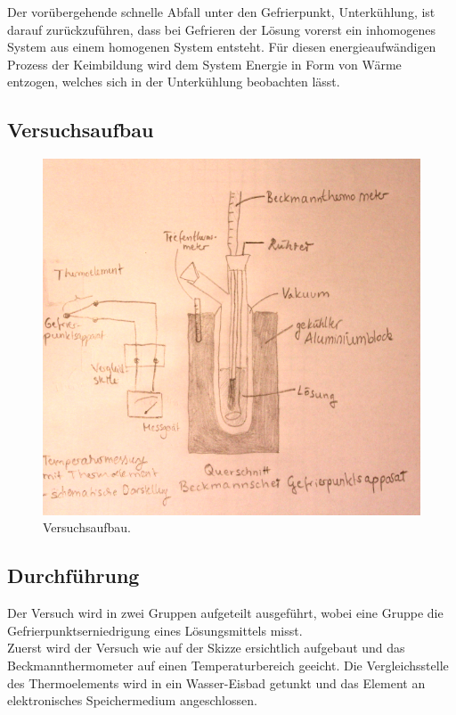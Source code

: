 \documentclass[12pt,a4paper,titlepage,headinclude,bibtotoc]{scrartcl}
\begin{document}
Der vorübergehende schnelle Abfall unter den Gefrierpunkt, Unterkühlung, ist darauf zurückzuführen, dass bei Gefrieren der Lösung vorerst ein inhomogenes System aus einem homogenen System entsteht. Für diesen energieaufwändigen Prozess der Keimbildung wird dem System Energie in Form von Wärme entzogen, welches sich in der Unterkühlung beobachten lässt.


\subsection{Versuchsaufbau}



\begin{figure} [h!]
\begin{center}
\includegraphics[scale=0.8]{Versuchsaufbau2neu.png} \end{center}
\caption{Versuchsaufbau.}
\end{figure}

\subsection{Durchführung}

Der Versuch wird in zwei Gruppen aufgeteilt ausgeführt, wobei eine Gruppe die Gefrierpunktserniedrigung eines Lösungsmittels misst. \\
Zuerst wird der Versuch wie auf der Skizze ersichtlich aufgebaut und das Beckmannthermometer auf einen Temperaturbereich geeicht.
 Die Vergleichsstelle des Thermoelements wird in ein Wasser-Eisbad getunkt und das Element an elektronisches Speichermedium angeschlossen.\\
 
\end{document}
